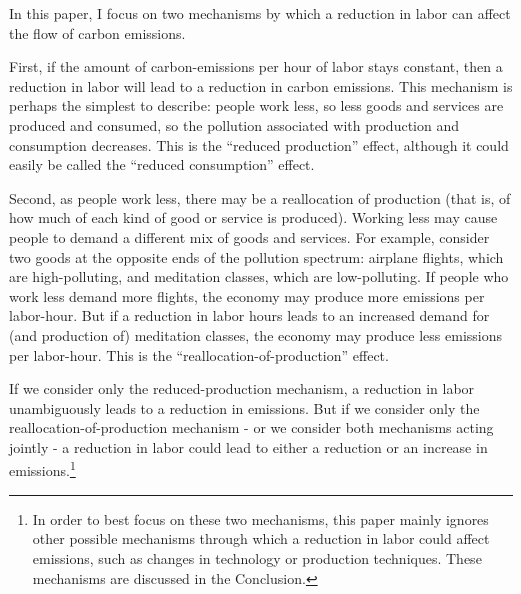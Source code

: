 \documentclass[letter, 12pt, epsf,leqno]{article}
\begin{document}
In this paper, I focus on two mechanisms by which a reduction in labor can affect the flow of carbon emissions.

First, if the amount of carbon-emissions per hour of labor stays constant, then a reduction in labor will lead to a reduction in carbon emissions.  This mechanism is perhaps the simplest to describe: people work less, so less goods and services are produced and consumed, so the pollution associated with production and consumption decreases.  This is the ``reduced production'' effect, although it could easily be called the ``reduced consumption'' effect.

Second, as people work less, there may be a reallocation of production (that is, of how much of each kind of good or service is produced).  Working less may cause people to demand a different mix of goods and services.  For example, consider two goods at the opposite ends of the pollution spectrum: airplane flights, which are high-polluting, and meditation classes, which are low-polluting.  If people who work less demand more flights, the economy may produce more emissions per labor-hour.  But if a reduction in labor hours leads to an increased demand for (and production of) meditation classes, the economy may produce less emissions per labor-hour.  This is the ``reallocation-of-production'' effect.

If we consider only the reduced-production mechanism, a reduction in labor unambiguously leads to a reduction in emissions.  But if we consider only the reallocation-of-production mechanism - or we consider both mechanisms acting jointly - a reduction in labor could lead to either a reduction or an increase in emissions.\footnote{
In order to best focus on these two mechanisms, this paper mainly ignores other possible mechanisms through which a reduction in labor could affect emissions, such as changes in technology or production techniques.  These mechanisms are discussed in the Conclusion.
}
\end{document}
